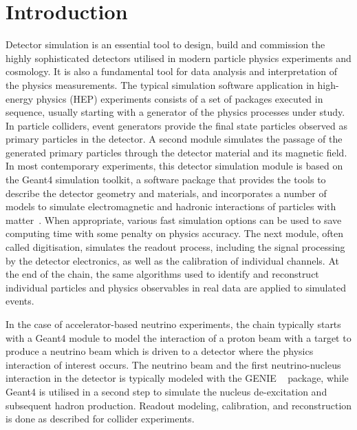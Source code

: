\documentclass[12pt,a4paper]{article}
\begin{document}
\maketitle

\newpage

\hypertarget{introduction}{%
\section{Introduction}\label{introduction}}

Detector simulation is an essential tool to design, build and commission
the highly sophisticated detectors utilised in modern particle physics
experiments and cosmology. It is also a fundamental tool for data
analysis and interpretation of the physics measurements. The typical
simulation software application in high-energy physics (HEP) experiments
consists of a set of packages executed in sequence, usually starting
with a generator of the physics processes under study. In particle
colliders, event generators provide the final state particles observed
as primary particles in the detector. A second module simulates the
passage of the generated primary particles through the detector material
and its magnetic field. In most contemporary experiments, this detector
simulation module is based on the Geant4 simulation toolkit, a software
package that provides the tools to describe the detector geometry and
materials, and incorporates a number of models to simulate
electromagnetic and hadronic interactions of particles with matter~\cite{ALLISON2016186}. 
When appropriate, various fast simulation options can be used
to save computing time with some penalty on physics accuracy. The next
module, often called digitisation, simulates the readout process,
including the signal processing by the detector electronics, as well as
the calibration of individual channels. At the end of the chain, the
same algorithms used to identify and reconstruct individual particles
and physics observables in real data are applied to simulated events.

In the case of accelerator-based neutrino experiments, the chain
typically starts with a Geant4 module to model the interaction of a
proton beam with a target to produce a neutrino beam which is driven to
a detector where the physics interaction of interest occurs. The
neutrino beam and the first neutrino-nucleus interaction in the detector
is typically modeled with the GENIE ~\cite{Andreopoulos:2009rq} package, while Geant4 is
utilised in a second step to simulate the nucleus de-excitation and
subsequent hadron production. Readout modeling, calibration, and
reconstruction is done as described for collider experiments.
\end{document}
